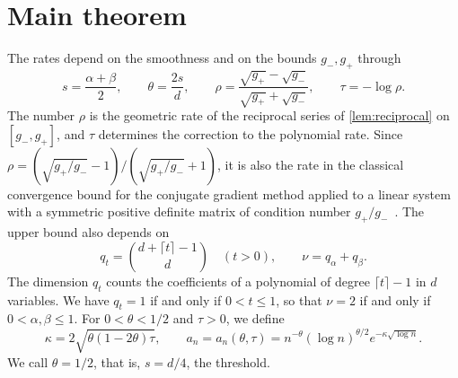 \section{Main theorem}\label{sec:main-theorem}

The rates depend on the smoothness and on the bounds $g_-,g_+$ through
\begin{equation}\label{eq:sharp-parameters}
 s=\frac{\alpha+\beta}{2},\qquad \theta=\frac{2s}{d},\qquad
 \rho=\frac{\sqrt{g_+}-\sqrt{g_-}}{\sqrt{g_+}+\sqrt{g_-}},
 \qquad\tau=-\log\rho.
\end{equation}
The number $\rho$ is the geometric rate of the reciprocal series of
\cref{lem:reciprocal} on $[g_-,g_+]$, and $\tau$ determines the
correction to the polynomial rate. Since
$\rho=(\sqrt{g_+/g_-}-1)/(\sqrt{g_+/g_-}+1)$, it is also the rate in the
classical convergence bound for the conjugate gradient method applied to
a linear system with a symmetric positive definite matrix of condition
number $g_+/g_-$~\cite[Lecture~38]{trefethenbau}. The upper bound also depends on
\begin{equation}\label{eq:poly-dimension}
 q_t=\binom{d+\lceil t\rceil-1}{d}\quad(t>0),\qquad
 \nu=q_\alpha+q_\beta.
\end{equation}
The dimension $q_t$ counts the coefficients of a polynomial of degree
$\lceil t\rceil-1$ in $d$ variables. We have $q_t=1$ if and only if
$0<t\le1$, so that $\nu=2$ if and only if $0<\alpha,\beta\le1$. For
$0<\theta<1/2$ and $\tau>0$, we define
\begin{equation}\label{eq:subcritical-scale}
 \kappa=2\sqrt{\theta(1-2\theta)\tau},\qquad
 a_n=a_n(\theta,\tau)=n^{-\theta}(\log n)^{\theta/2}e^{-\kappa\sqrt{\log n}}.
\end{equation}
We call $\theta=1/2$, that is, $s=d/4$, the threshold.

